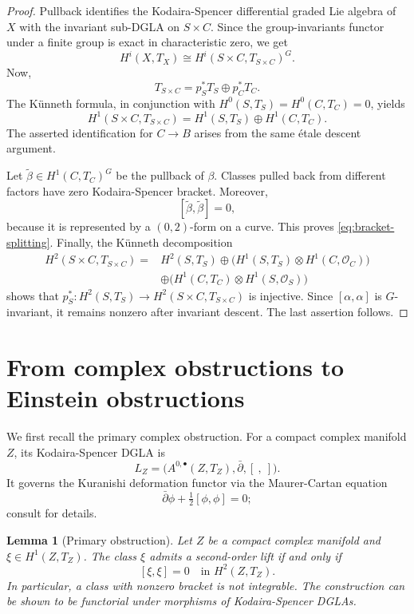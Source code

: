 \documentclass[11pt]{amsart}
\numberwithin{equation}{section}
\theoremstyle{plain}
\newtheorem{lemma}[theorem]{Lemma}
\theoremstyle{definition}
\newcommand{\cO}{\mathcal{O}}
\newcommand{\dbar}{\bar\partial}
\newcommand{\half}{\tfrac12}
\begin{document}
\begin{proof}
Pullback identifies the Kodaira-Spencer differential graded Lie algebra of $X$ with the invariant sub-DGLA on $S\times C$. Since the group-invariants functor under a finite group is exact in characteristic zero, we get
$$H^i(X,T_X)\cong H^i(S\times C,T_{S\times C})^G.$$
Now,
$$T_{S\times C}=p_S^*T_S\oplus p_C^*T_C.$$
The K\"unneth formula, in conjunction with $H^0(S,T_S)=H^0(C,T_C)=0$, yields
$$H^1(S\times C,T_{S\times C})
=H^1(S,T_S)\oplus H^1(C,T_C).$$
The asserted identification for $C\to B$ arises from the same \'etale descent argument.

Let $\widetilde\beta\in H^1(C,T_C)^G$ be the pullback of $\beta$. Classes pulled back from different factors have zero Kodaira-Spencer bracket. Moreover,
$$[\widetilde\beta,\widetilde\beta]=0,$$
because it is represented by a $(0,2)$-form on a curve. This proves \eqref{eq:bracket-splitting}. Finally, the K\"unneth decomposition
\begin{align*}
H^2(S\times C,T_{S\times C})={}&H^2(S,T_S)
\oplus\bigl(H^1(S,T_S)\otimes H^1(C,\cO_C)\bigr)\\
&\oplus\bigl(H^1(C,T_C)\otimes H^1(S,\cO_S)\bigr)
\end{align*}
shows that $p_S^*\colon H^2(S,T_S)\to H^2(S\times C,T_{S\times C})$ is injective. Since $[\alpha,\alpha]$ is $G$-invariant, it remains nonzero after invariant descent. The last assertion follows.
\end{proof}

\section{From complex obstructions to Einstein obstructions}

We first recall the primary complex obstruction. For a compact complex manifold $Z$, its Kodaira-Spencer DGLA is
$$
L_Z=\bigl(A^{0,\bullet}(Z,T_Z),\dbar,[\ ,\ ]\bigr).$$
It governs the Kuranishi deformation functor via the Maurer-Cartan equation
$$\dbar\phi+\half[\phi,\phi]=0;$$
consult \cite{Kodaira,Kuranishi,ManettiDGLA,Sernesi}for details.

\begin{lemma}[Primary obstruction]\label{lem:primary}
Let $Z$ be a compact complex manifold and $\xi\in H^1(Z,T_Z)$. The class $\xi$ admits a second-order lift if and only if
$$[\xi,\xi]=0\quad\text{in }H^2(Z,T_Z).$$
In particular, a class with nonzero bracket is not integrable. The construction can be shown to be functorial under morphisms of Kodaira-Spencer DGLAs.
\end{lemma}
\end{document}

